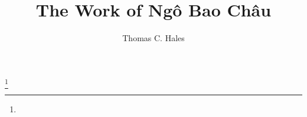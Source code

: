 \documentclass[11pt]{amsart} %
\begin{document}
\title{The Work of Ng\^o Bao Ch\^au}
\author{Thomas C. Hales} 
\thanks{}
\maketitle



\raggedright

\end{document}
